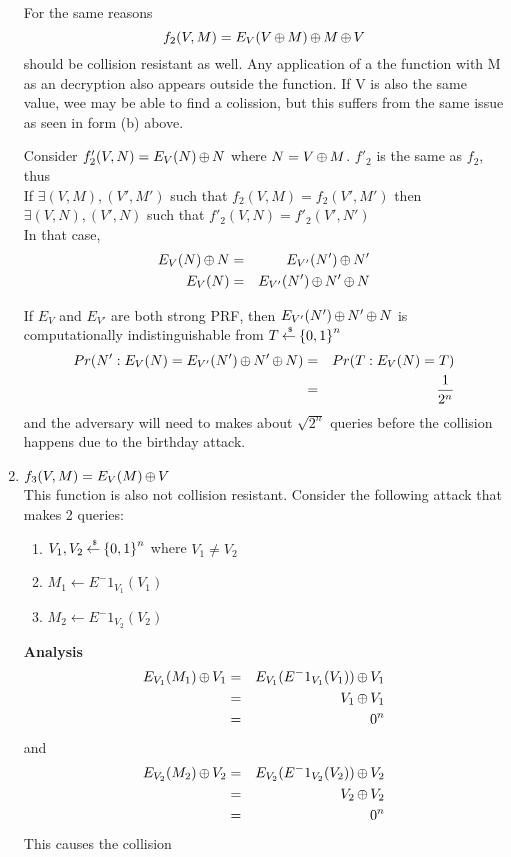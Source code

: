 \documentclass[11pt]{article}
\begin{document}
\begin{enumerate}
For the same reasons
\[
f_2(V,M) = E_V(V {\,\oplus\,} M) {\,\oplus\,} M {\,\oplus\,} V
\]
should be collision resistant as well. Any application of a the function with M as an decryption  also appears outside the function.  If V is also the same value, wee may be able to find a colission, but this suffers from the same issue as seen in form (b) above.

Consider $f'_2(V,N)=E_V(N) {\,\oplus\,} N$ where $N=V {\,\oplus\,} M$. $f'_2$ is the same as $f_2$, thus\\If $\exists (V, M), (V', M')$ such that $f_2(V,M)=f_2(V', M')$ then\\ $\exists (V, N), (V', N)$ such that $f'_2(V,N)=f'_2(V', N')$\\

In that case,\\
\begin{eqnarray*}
E_V(N) {\,\oplus\,} N &=& E_{V'}(N') {\,\oplus\,} N'\\
E_V(N)&=& E_{V'}(N') {\,\oplus\,} N' {\,\oplus\,} N\\
\end{eqnarray*}

If $E_V$ and $E_{V'}$ are both strong PRF, then $E_{V'}(N') {\,\oplus\,} N' {\,\oplus\,} N$ is computationally indistinguishable from $T {\:\stackrel{{\scriptscriptstyle \hspace{0.2em}\$}} {\leftarrow}\:} {\{0,1\}}^n$
\begin{eqnarray*}
Pr(N': E_V(N)= E_{V'}(N') {\,\oplus\,} N' {\,\oplus\,} N)&=&Pr(T: E_V(N)=T)\\
&=&\frac{1}{2^n}
\end{eqnarray*}
and the adversary will need to makes about $\sqrt{2^n}$ queries before the collision happens due to the birthday attack.
\item $f_3(V,M) = E_V(M) {\,\oplus\,} V$
\\This function is also not collision resistant. Consider the following attack that makes 2 queries:\\
\begin{enumerate}
\item $V_1, V_2 {\:\stackrel{{\scriptscriptstyle \hspace{0.2em}\$}} {\leftarrow}\:} {\{0,1\}}^n$ where $V_1 \neq V_2$\\
\item $M_1 \gets E^-1_{V_1}(V_1)$\\
\item $M_2 \gets E^-1_{V_2}(V_2)$\\
\end{enumerate}

\textbf{Analysis}
\begin{eqnarray*}
E_{V_1}(M_1) {\,\oplus\,} V_1 &=& E_{V_1}(E^-1_{V_1}(V_1)) {\,\oplus\,} V_1 \\
&=& V_1 {\,\oplus\,} V_1 \\
&=& 0^n\\
\end{eqnarray*}
and
\begin{eqnarray*}
E_{V_2}(M_2) {\,\oplus\,} V_2 &=& E_{V_2}(E^-1_{V_2}(V_2)) {\,\oplus\,} V_2 \\
&=& V_2 {\,\oplus\,} V_2 \\
&=& 0^n\\
\end{eqnarray*}
This causes the collision\\
\end{enumerate}
\end{document}
